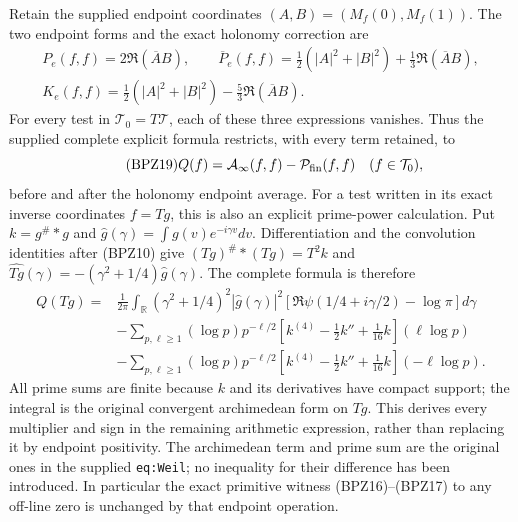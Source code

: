 Retain the supplied endpoint coordinates $(A,B)=(M_f(0),M_f(1))$.
The two endpoint forms and the exact holonomy correction are
\begin{equation}\tag{BPZ18}
\begin{gathered}
 P_e(f,f)=2\Re(\overline A B),\qquad
 \overline P_e(f,f)=\tfrac12(|A|^2+|B|^2)
                         +\tfrac13\Re(\overline A B),\\
 K_e(f,f)=\tfrac12(|A|^2+|B|^2)
                         -\tfrac53\Re(\overline A B).
\end{gathered}
\end{equation}
For every test in $\mathcal T_0=T\mathcal T$, each of these three
expressions vanishes. Thus the supplied complete explicit formula
restricts, with every term retained, to
\begin{equation}\tag{BPZ19}
 Q(f)=\mathcal A_\infty(f,f)-\mathcal P_{\rm fin}(f,f)
                  \quad(f\in\mathcal T_0),
\end{equation}
before and after the holonomy endpoint average.
For a test written in its exact inverse coordinates $f=Tg$, this is
also an explicit prime-power calculation. Put $k=g^\#*g$ and
$\widehat g(\gamma)=\int g(v)e^{-i\gamma v}dv$. Differentiation and
the convolution identities after (BPZ10) give
$(Tg)^\#*(Tg)=T^2k$ and
$\widehat{Tg}(\gamma)=-(\gamma^2+1/4)\widehat g(\gamma)$.
The complete formula is therefore
\begin{equation}\tag{BPZ23}
\begin{aligned}
 Q(Tg)={}&\frac1{2\pi}\int_{\mathbb R}
  (\gamma^2+1/4)^2|\widehat g(\gamma)|^2
  [\Re\psi(1/4+i\gamma/2)-\log\pi]d\gamma\\
 &-\sum_{p,\ell\ge1}(\log p)p^{-\ell/2}
   \left[k^{(4)}-\tfrac12k''+\tfrac1{16}k\right](\ell\log p)\\
 &-\sum_{p,\ell\ge1}(\log p)p^{-\ell/2}
   \left[k^{(4)}-\tfrac12k''+\tfrac1{16}k\right](-\ell\log p).
\end{aligned}
\end{equation}
All prime sums are finite because $k$ and its derivatives have compact
support; the integral is the original convergent archimedean form on
$Tg$. This derives every multiplier and sign in the remaining
arithmetic expression, rather than replacing it by endpoint positivity.
The archimedean term and prime sum are the original ones in the
supplied \texttt{eq:Weil}; no inequality for their difference has been
introduced. In particular the exact primitive witness (BPZ16)--(BPZ17)
to any off-line zero is unchanged by that endpoint operation.

